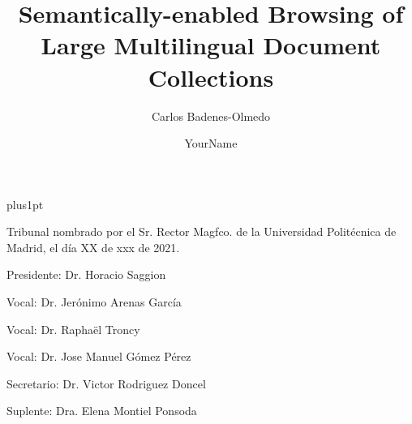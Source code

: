 \documentclass[twoside,11pt]{Latex/Classes/PhDthesisPSnPDF}
\title{Semantically-enabled Browsing of Large Multilingual Document Collections}
\author{{\hspace{16mm} Carlos Badenes-Olmedo }}
\author{YourName}
\begin{document}

\renewcommand\baselinestretch{1.2}
\baselineskip=18pt plus1pt

\theoremstyle{plain}
\newtheorem{thm}{Theorem}[chapter] %

\theoremstyle{definition}
\newtheorem{defn}[thm]{Definition} %

\newcommand{\attention}[1]{{\color{red}\textbf{#1}}}
\newcommand{\comm}[1]{{\color{red}(Comment:#1)}}
\newcommand{\duda}[1]{{\color{red}(DUDA:#1)}}

\renewcommand\appendixname{ANNEX}


\frontmatter
\maketitle  %



\pagestyle{plain}
\cleardoublepage
\pagestyle{plain}

\noindent Tribunal nombrado por el Sr. Rector Magfco. de la Universidad Polit\'{e}cnica de
Madrid, el d\'{i}a XX de xxx de 2021.

\vspace{10mm}
Presidente:\hspace{0.3mm} Dr. Horacio Saggion

\vspace{5mm}
Vocal: \hspace{6.7mm} Dr. Jerónimo Arenas García

\vspace{5mm}
Vocal: \hspace{6.7mm} Dr. Raphaël Troncy

\vspace{5mm}
Vocal: \hspace{6.7mm} Dr. Jose Manuel Gómez Pérez

\vspace{5mm}
Secretario:\hspace{0.65mm} Dr. Victor Rodriguez Doncel

\vspace{5mm}
Suplente: \hspace{1.5mm} Dra. Elena Montiel Ponsoda
\end{document}
